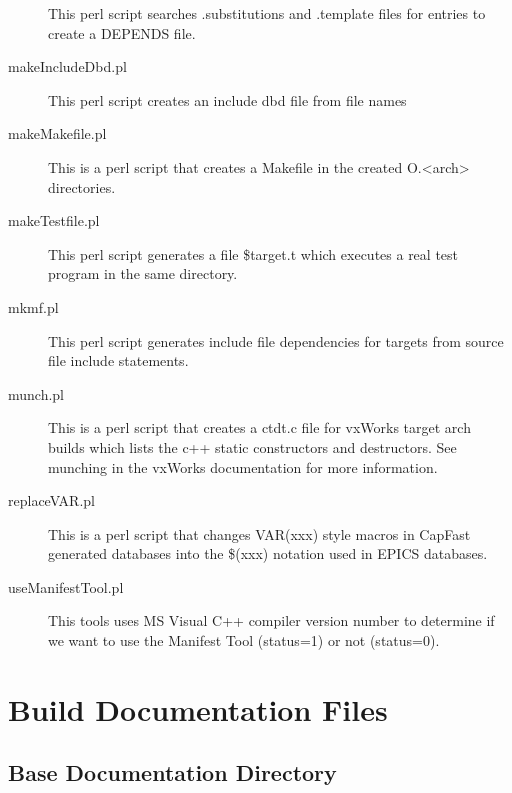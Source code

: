 \begin{description}
This perl script searches .substitutions and .template files for entries to create a DEPENDS file.

\item[makeIncludeDbd.pl]

This perl script creates an include dbd file from file names

\item[makeMakefile.pl]

This is a perl script that creates a Makefile in the created O.\textless{}arch\textgreater{} directories.

\item[makeTestfile.pl]

This perl script generates a file \$target.t which executes a real test program in the same directory.

\item[mkmf.pl]

This perl script generates include file dependencies for targets from source file include statements.

\item[munch.pl]

This is a perl script that creates a ctdt.c file for vxWorks target arch builds which lists the c++ static constructors 
and destructors. See munching in the vxWorks documentation for more information.

\item[replaceVAR.pl]

This is a perl script that changes VAR(xxx) style macros in CapFast generated databases into the \$(xxx) notation 
used in EPICS databases.

\item[useManifestTool.pl]

This tools uses MS Visual C++ compiler version number to determine if we want to use the Manifest Tool 
(status=1) or not (status=0).

\end{description}

\section{Build Documentation Files}

\subsection{Base Documentation Directory}

